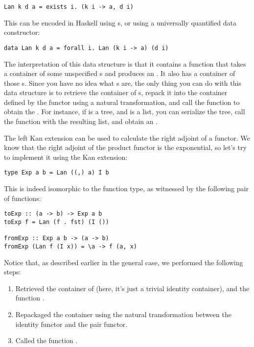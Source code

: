 \begin{Verbatim}
Lan k d a = exists i. (k i -> a, d i)
\end{Verbatim}
This can be encoded in Haskell using s, or using a universally
quantified data constructor:

\begin{Verbatim}
data Lan k d a = forall i. Lan (k i -> a) (d i)
\end{Verbatim}
The interpretation of this data structure is that it contains a function
that takes a container of some unspecified s and produces an
. It also has a container of those s. Since you have
no idea what s are, the only thing you can do with this data
structure is to retrieve the container of s, repack it into
the container defined by the functor  using a natural
transformation, and call the function to obtain the . For
instance, if  is a tree, and  is a list, you can
serialize the tree, call the function with the resulting list, and
obtain an .

The left Kan extension can be used to calculate the right adjoint of a
functor. We know that the right adjoint of the product functor is the
exponential, so let's try to implement it using the Kan extension:

\begin{Verbatim}
type Exp a b = Lan ((,) a) I b
\end{Verbatim}
This is indeed isomorphic to the function type, as witnessed by the
following pair of functions:

\begin{Verbatim}
toExp :: (a -> b) -> Exp a b
toExp f = Lan (f . fst) (I ())

fromExp :: Exp a b -> (a -> b)
fromExp (Lan f (I x)) = \a -> f (a, x)
\end{Verbatim}
Notice that, as described earlier in the general case, we performed the
following steps:

\begin{enumerate}
\tightlist
\item
Retrieved the container of  (here, it's
just a trivial identity container), and the function .
\item
Repackaged the container using the natural transformation between the
identity functor and the pair functor.
\item
Called the function .
\end{enumerate}

